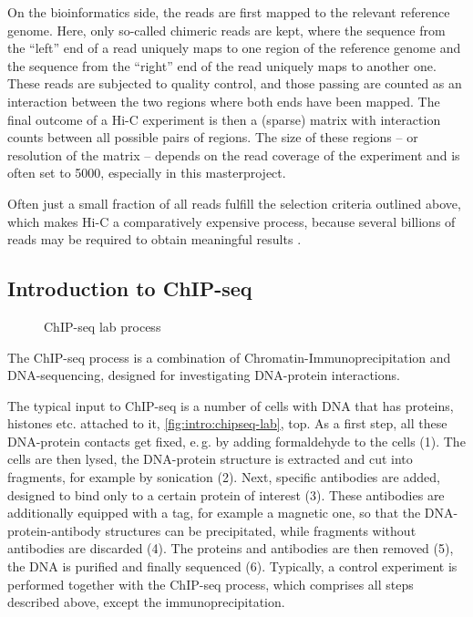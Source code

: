 On the bioinformatics side, the reads are first mapped to the relevant reference genome.
Here, only so-called chimeric reads are kept, where the sequence from the ``left'' end of a read
uniquely maps to one region of the reference genome and the sequence from the ``right'' end 
of the read uniquely maps to another one.
These reads are subjected to quality control, and those passing are counted as an interaction
between the two regions where both ends have been mapped.
The final outcome of a Hi-C experiment is then a (sparse) matrix with interaction counts 
between all possible pairs of regions.
The size of these regions -- or resolution of the matrix -- depends on the read coverage
of the experiment and is often set to \SI{5000}{\bp}, especially in this masterproject.

Often just a small fraction of all reads fulfill the selection criteria outlined above,
which makes Hi-C a comparatively expensive process, because several billions
of reads may be required to obtain meaningful results \cite{Rao2014}.

\clearpage
\subsection{Introduction to ChIP-seq} \label{sec:intro:chipseq}
\begin{wrapfigure}[38]{l}{0.3\textwidth}
 \caption{ChIP-seq lab process}
 \label{fig:intro:chipseq-lab}
\end{wrapfigure}
The ChIP-seq process is a combination of Chromatin-Immunoprecipitation and DNA-sequencing, 
designed for investigating DNA-protein interactions.

The typical input to ChIP-seq is a number of cells with DNA that has proteins, histones etc. attached to
it, \autoref{fig:intro:chipseq-lab}, top. 
As a first step, all these DNA-protein contacts get fixed, 
e.\,g. by adding formaldehyde to the cells (1).
The cells are then lysed, the DNA-protein structure is extracted and cut into fragments, 
for example by sonication (2).
Next, specific antibodies are added, designed to bind only to a certain protein of interest (3).
These antibodies are additionally equipped with a tag, for example a magnetic one, so that 
the DNA-protein-antibody structures can be precipitated, while fragments without antibodies are discarded (4).
The proteins and antibodies are then removed (5), 
the DNA is purified and finally sequenced (6).
Typically, a control experiment is performed together with the ChIP-seq process, 
which comprises all steps described above, except the immunoprecipitation.


